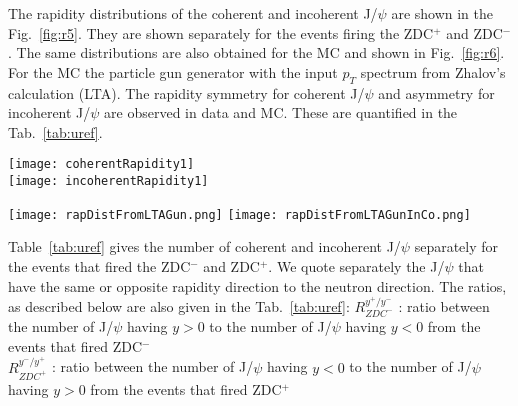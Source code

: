     The rapidity distributions of the coherent and incoherent J/$\psi$ are shown in
      the Fig.~\ref{fig:r5}. 
    They are shown separately for the events firing the ZDC$^{+}$ and ZDC$^{-}$. 
    The same distributions are also obtained for the MC and shown in 
      Fig.~\ref{fig:r6}. 
    For the MC the particle gun generator with the input $p_{T}$ spectrum from 
      Zhalov's  calculation (LTA). 
    The rapidity symmetry for coherent J/$\psi$ and asymmetry for incoherent 
      J/$\psi$ are observed in data and MC. 
    These are quantified in the Tab.~\ref{tab:uref}. 
    
    \begin{figure*}[!Hhtb]
      \begin{center}
        \texttt{[image: coherentRapidity1]}\\
            \texttt{[image: incoherentRapidity1]}
             \caption{
        \label{fig:r5}  
        The rapidity distribution of the coherent (top) and incoherent (bottom) J/$\psi$ for the  ZDC$^{+}$ and ZDC$^{-}$. 
            }
           \end{center}
    \end{figure*}
    
    \begin{figure*}[!Hhtb]
      \begin{center}
        \texttt{[image: rapDistFromLTAGun.png]}
            \texttt{[image: rapDistFromLTAGunInCo.png]}
                 \caption{
        \label{fig:r6}  
          The rapidity distribution of the coherent (left) and incoherent (right) J/$\psi$ for the  ZDC$^{+}$ and ZDC$^{-}$ from MC (particle gun with customized $J/\psi p_{T}$ input distribution). 
            }
           \end{center}
    \end{figure*}
    
    Table~\ref{tab:uref} gives the number of coherent and incoherent J/$\psi$ 
      separately for the events that fired the ZDC$^{-}$ and ZDC$^{+}$. 
    We quote separately the J/$\psi$ that have the same or opposite rapidity 
      direction to the neutron direction. 
    The ratios, as described below are also given in the Tab.~\ref{tab:uref}: 
      $R_{ZDC^{-}}^{y^{+}/y^{-}}$ : ratio between the number of J/$\psi$ having 
        $y>0$ to the number of J/$\psi$ having $y<0$ from the events that fired 
        ZDC$^{-}$\\
      $R_{ZDC^{+}}^{y^{-}/y^{+}}$ : ratio between the number of J/$\psi$ having 
        $y<0$ to the number of J/$\psi$ having $y>0$ from the events that fired 
        ZDC$^{+}$\\
    
